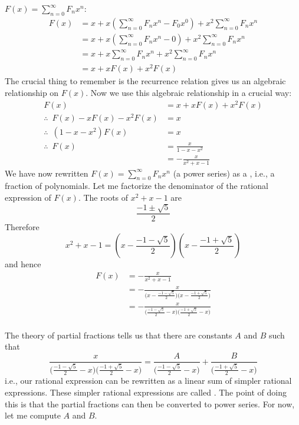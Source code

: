 $F(x) = \sum_{n=0}^\infty F_n x^n$:
\begin{align*}
F(x) 
&= x + x \left( \sum_{n=0}^\infty F_n x^n - F_0 x^0 \right) + x^2\sum_{n=0}^\infty F_n x^n \\
&= x + x \left( \sum_{n=0}^\infty F_n x^n - 0 \right) + x^2\sum_{n=0}^\infty F_n x^n \\
&= x + x \sum_{n=0}^\infty F_n x^n + x^2\sum_{n=0}^\infty F_n x^n \\
&= x + xF(x) + x^2F(x) 
\end{align*}
The crucial thing to remember is the recurrence relation
gives us an algebraic relationship on $F(x)$.
Now we use this algebraic relationship in a crucial way:
\begin{align*}
F(x)
&= x + xF(x) + x^2F(x) \\
\therefore \,\,\, F(x) - xF(x) - x^2F(x) &= x \\
\therefore \,\,\, (1 - x - x^2)F(x) &= x \\
\therefore \,\,\, F(x)
&= \frac{x}{1 - x - x^2}  \\
&= -\frac{x}{x^2 + x -1} 
\end{align*}
We have now rewritten $F(x) = \sum_{n=0}^\infty F_n x^n$ (a power series)
as a , i.e., a fraction of polynomials.
Let me factorize the denominator of the rational expression of $F(x)$.
The roots of $x^2 + x - 1$ are
\[
\frac{-1 \pm \sqrt{5}}{2}
\]
Therefore 
\[
x^2 + x - 1 = 
\left( x - \frac{-1 - \sqrt{5}}{2} \right)
\left( x - \frac{-1 + \sqrt{5}}{2} \right)
\]
and hence
\begin{align*}
F(x) 
&= -\frac{x}{x^2 + x - 1} \\
&= -\frac{x}{
\bigl( x - \frac{-1 - \sqrt{5}}{2} \bigr)
\bigl( x - \frac{-1 + \sqrt{5}}{2} \bigr)
} \\
&= - \frac{x}{
\bigl( \frac{-1 - \sqrt{5}}{2} - x\bigr)
\bigl( \frac{-1 + \sqrt{5}}{2} - x\bigr)
} \\
\end{align*}

The theory of partial fractions tells us that
there are constants $A$ and $B$ such that
\[
\frac{x}{
\bigl( \frac{-1 - \sqrt{5}}{2} - x\bigr)
\bigl( \frac{-1 + \sqrt{5}}{2} - x\bigr)
} 
= 
\frac{A}{\bigl( \frac{-1 - \sqrt{5}}{2} - x\bigr) } + 
\frac{B}{\bigl( \frac{-1 + \sqrt{5}}{2} - x\bigr) }
\]
i.e., our rational expression can be rewritten as
a linear sum of simpler rational expressions.
These simpler rational expressions are called .
The point of doing this is that the partial fractions can then
be converted to power series.
For now, let me compute $A$ and $B$.

